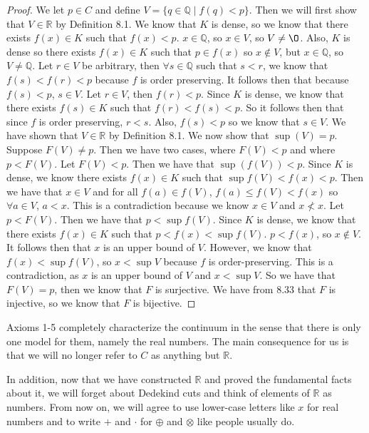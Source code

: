 \documentclass[12pt]{article}
\newcommand{\bbQ}{\mathbb{Q}}
\newcommand{\bbR}{\mathbb{R}}
\renewcommand{\emptyset}{\O}
\renewcommand{\_}[1]{\underline{ #1 }}
\theoremstyle{definition}
\numberwithin{equation}{subsection}
\begin{document}
\begin{proof}
We let $p \in C$ and define $V = \{q \in \bbQ \mid f(q) < p \}$. Then we will first show that $V \in \bbR$ by Definition 8.1. We know that $K$ is dense, so we know that there exists $f(x) \in K$ such that $f(x) < p$. $x \in \bbQ$, so $x \in V$, so $V \not = \emptyset$. Also, $K$ is dense so there exists $f(x) \in K$ such that $p \in f(x)$ so $x \not \in V$, but $x \in \bbQ$, so $V \not = \bbQ$. \newline
Let $r \in V$ be arbitrary, then $\forall s \in \bbQ$ such that $s < r$, we know that $f(s) < f(r) < p$ because $f$ is order preserving. It follows then that because $f(s) < p$, $s \in V$. \newline
Let $r \in V$, then $f(r) < p$. Since $K$ is dense, we know that there exists $f(s) \in K$ such that $f(r) < f(s) < p$. So it follows then that since $f$ is order preserving, $r < s$. Also, $f(s) < p$ so we know that $s \in V$. \newline
We have shown that $V \in \bbR$ by Definition 8.1. We now show that $\sup(V) = p$. Suppose $F(V) \not = p$. Then we have two cases, where $F(V) < p$ and where $p < F(V)$. \newline
Let $F(V) < p$. Then we have that $\sup(f(V)) < p$. Since $K$ is dense, we know there exists $f(x) \in K$ such that $\sup f(V) < f(x) < p$. Then we have that $x \in V$ and for all $f(a) \in f(V)$, $f(a) \leq f(V)< f(x)$ so $\forall a \in V$, $a < x$. This is a contradiction because we know $x \in V$ and $x \not < x$. \newline
Let $p < F(V)$. Then we have that $p < \sup f(V)$. Since $K$ is dense, we know that there exists $f(x) \in K$ such that $p < f(x) < \sup f(V)$. $p < f(x)$, so $x \not \in V$. It follows then that $x$ is an upper bound of $V$. However, we know that $f(x) < \sup f(V)$, so $x < \sup V$ because $f$ is order-preserving. This is a contradiction, as $x$ is an upper bound of $V$ and $x < \sup V$. \newline
So we have that $F(V) = p$, then we know that $F$ is surjective. We have from 8.33 that $F$ is injective, so we know that $F$ is bijective.
\end{proof}

\bigskip

Axioms 1-5 completely characterize the continuum in the sense that there is only one model for them, namely the real numbers. The main consequence for us is that we will no longer refer to $C$ as anything but $\bbR.$ 

In addition, now that we have constructed $\bbR$ and proved the fundamental facts about it, we will forget about Dedekind cuts and think of elements of $\bbR$ as numbers. From now on, we will agree to use lower-case letters like $x$ for real numbers and to write $+$ and $\cdot$ for $\oplus$ and $\otimes$ like people usually do.
\end{document}
